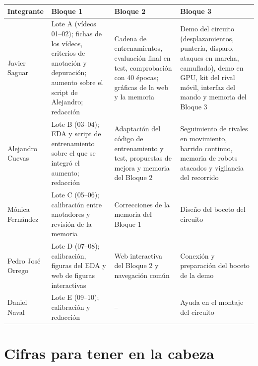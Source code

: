 \documentclass[11pt,a4paper]{article}
\begin{document}
{\small
\begin{longtable}{@{}P{2.3cm}P{4.2cm}P{3.8cm}P{4.2cm}@{}}
\toprule
\textbf{Integrante} & \textbf{Bloque 1} & \textbf{Bloque 2} & \textbf{Bloque 3} \\
\midrule
\endhead
Javier Saguar & Lote A (vídeos 01--02); fichas de los vídeos, criterios de anotación y depuración; aumento sobre el script de Alejandro; redacción & Cadena de entrenamientos, evaluación final en test, comprobación con 40 épocas; gráficas de la web y la memoria & Demo del circuito (desplazamientos, puntería, disparo, ataques en marcha, camuflado), demo en GPU, kit del rival móvil, interfaz del mando y memoria del Bloque 3 \\
Alejandro Cuevas & Lote B (03--04); EDA y script de entrenamiento sobre el que se integró el aumento; redacción & Adaptación del código de entrenamiento y test, propuestas de mejora y memoria del Bloque 2 & Seguimiento de rivales en movimiento, barrido continuo, memoria de robots atacados y vigilancia del recorrido \\
Mónica Fernández & Lote C (05--06); calibración entre anotadores y revisión de la memoria & Correcciones de la memoria del Bloque 1 & Diseño del boceto del circuito \\
Pedro José Orrego & Lote D (07--08); calibración, figuras del EDA y web de figuras interactivas & Web interactiva del Bloque 2 y navegación común & Conexión y preparación del boceto de la demo \\
Daniel Naval & Lote E (09--10); calibración y redacción & -- & Ayuda en el montaje del circuito \\
\bottomrule
\end{longtable}
}

\section{Cifras para tener en la cabeza}\label{sec:cifras}
\end{document}
